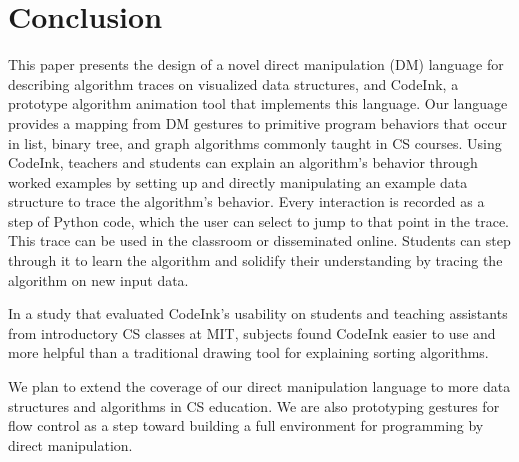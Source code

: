 \section{Conclusion}

This paper presents the design of a novel direct manipulation (DM)
language for describing algorithm traces on visualized data structures,
and CodeInk, a prototype algorithm animation tool that implements this
language. Our language provides a mapping from DM gestures to primitive
program behaviors that occur in list, binary tree, and graph algorithms
commonly taught in CS courses. Using CodeInk, teachers and students can
explain an algorithm's behavior through worked examples by setting up
and directly manipulating an example data structure to trace the
algorithm's behavior. Every interaction is recorded as a step of Python
code, which the user can select to jump to that point in the trace.
%
This trace can be used in the classroom or disseminated online. Students
can step through it to learn the algorithm and solidify their
understanding by tracing the algorithm on new input data.

In a study that evaluated CodeInk's usability on students and teaching
assistants from introductory CS classes at MIT, subjects found CodeInk
easier to use and more helpful than a traditional drawing tool for
explaining sorting algorithms.

We plan to extend the coverage of our direct manipulation language to
more data structures and algorithms in CS education. We are also
prototyping gestures for flow control as a step toward building a full
environment for programming by direct manipulation.
